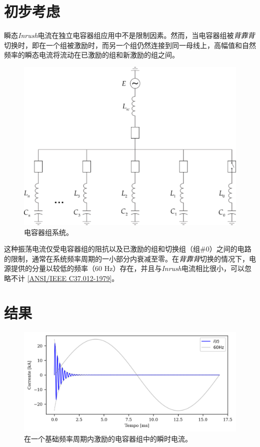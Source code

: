 \documentclass[a4paper]{article}
\begin{document}
	\section{初步考虑}
	
	瞬态\textit{Inrush}电流在独立电容器组应用中不是限制因素。然而，当电容器组被\textit{背靠背}切换时，即在一个组被激励时，而另一个组仍然连接到同一母线上，高幅值和自然频率的瞬态电流将流动在已激励的组和新激励的组之间。
	
	\begin{figure}[!hbp]
		\centering
		\includegraphics{Picture1.png}
		\caption{电容器组系统。}
		\label{fig:picture1}
	\end{figure}
	
	这种振荡电流仅受电容器组的阻抗以及已激励的组和切换组（组\#0）之间的电路的限制，通常在系统频率周期的一小部分内衰减至零。在\textit{背靠背}切换的情况下，电源提供的分量以较低的频率（60 Hz）存在，并且与\textit{Inrush}电流相比很小，可以忽略不计 \href{https://ieeexplore.ieee.org/document/7035261}{[ANSI/IEEE C37.012-1979]}。
	
	\section{结果}
	\begin{figure}[!hbp]
		\centering
		\includegraphics{Correntes.png}
		\caption{在一个基础频率周期内激励的电容器组中的瞬时电流。}
		\label{fig:picture2}
	\end{figure}
	
\end{document}

